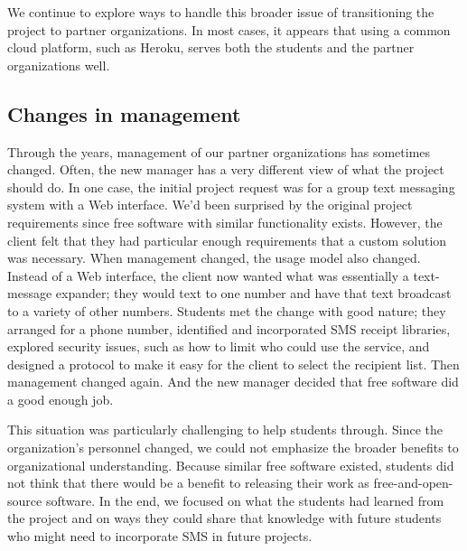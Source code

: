 We continue to explore ways to handle this broader issue of
transitioning the project to partner organizations.  In most cases,
it appears that using a common cloud platform, such as Heroku,
serves both the students and the partner organizations well.

\subsection{Changes in management}

Through the years, management of our partner organizations has
sometimes changed.  Often, the new manager has a very different
view of what the project should do.  In one case, the initial project
request was for a group text messaging system with a Web interface.
We'd been surprised by the original project requirements since
free software with similar functionality exists.  However, the
client felt that they had particular enough requirements that a custom
solution was necessary.  When management changed, the usage model
also changed.  Instead of a Web interface, the client now wanted
what was essentially a text-message expander; they would text to
one number and have that text broadcast to a variety of other
numbers.  Students met the change with good nature; they arranged
for a phone number, identified and incorporated SMS receipt libraries,
explored security issues, such as how to limit who could use the
service, and designed a protocol to make it easy for the client to
select the recipient list.  Then management changed again.  And the
new manager decided that free software did a good enough job.

This situation was particularly challenging to help students through.
Since the organization's personnel changed, we could not emphasize
the broader benefits to organizational understanding.  Because
similar free software existed, students did not think that there
would be a benefit to releasing their work as free-and-open-source
software.  In the end, we focused on what the students had learned
from the project and on ways they could share that knowledge with
future students who might need to incorporate SMS in future projects.

